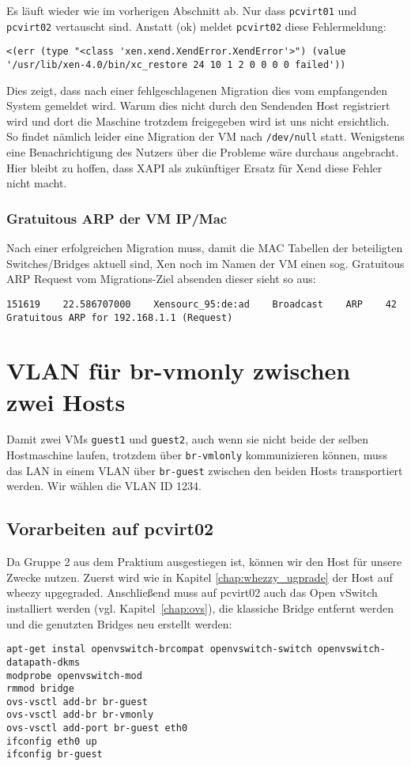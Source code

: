Es läuft wieder wie im vorherigen Abschnitt ab. Nur dass \verb#pcvirt01# und \verb#pcvirt02# vertauscht sind. Anstatt (ok) meldet \verb#pcvirt02# diese Fehlermeldung:
\setupVerbatimOut
\begin{verbatim}
<(err (type "<class 'xen.xend.XendError.XendError'>") (value '/usr/lib/xen-4.0/bin/xc_restore 24 10 1 2 0 0 0 0 failed'))
\end{verbatim}

Dies zeigt, dass nach einer fehlgeschlagenen Migration dies vom empfangenden System gemeldet wird. Warum dies nicht durch den Sendenden Host registriert wird und dort die Maschine trotzdem freigegeben wird ist uns nicht ersichtlich. So findet nämlich leider eine Migration der VM nach \verb#/dev/null# statt. Wenigstens eine Benachrichtigung des Nutzers über die Probleme wäre durchaus angebracht. Hier bleibt zu hoffen, dass XAPI als zukünftiger Ersatz für Xend diese Fehler nicht macht.

\subsection{Gratuitous ARP der VM IP/Mac}

Nach einer erfolgreichen Migration muss, damit die MAC Tabellen der beteiligten Switches/Bridges aktuell sind, Xen noch im Namen der VM einen sog. Gratuitous ARP Request vom Migrations-Ziel absenden dieser sieht so aus:

\setupVerbatimOut
\begin{verbatim}
151619    22.586707000    Xensourc_95:de:ad    Broadcast    ARP    42    Gratuitous ARP for 192.168.1.1 (Request)
\end{verbatim}


\chapter{VLAN für br-vmonly zwischen zwei Hosts}

Damit zwei VMs \verb#guest1# und \verb#guest2#, auch wenn sie nicht beide der selben Hostmaschine laufen, trotzdem über \verb#br-vmlonly# kommunizieren können, muss das LAN in einem VLAN über \verb#br-guest# zwischen den beiden Hosts transportiert werden. Wir wählen die VLAN ID 1234.

\section {Vorarbeiten auf pcvirt02}
Da Gruppe 2 aus dem Praktium ausgestiegen ist, können wir den Host für unsere Zwecke nutzen. Zuerst wird wie in Kapitel \ref{chap:whezzy_ugprade} der Host auf wheezy upgegraded.
Anschließend muss auf pcvirt02 auch das Open vSwitch installiert werden (vgl. Kapitel~\ref{chap:ovs}), die klassiche Bridge entfernt werden und die genutzten Bridges neu erstellt werden:
\begin{verbatim}
apt-get instal openvswitch-brcompat openvswitch-switch openvswitch-datapath-dkms
modprobe openvswitch-mod
rmmod bridge
ovs-vsctl add-br br-guest
ovs-vsctl add-br br-vmonly
ovs-vsctl add-port br-guest eth0
ifconfig eth0 up
ifconfig br-guest
\end{verbatim}

